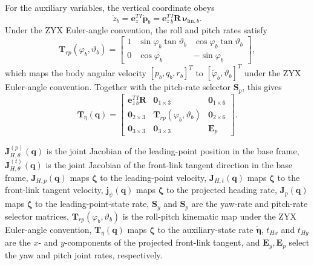 \documentclass[12pt,a4paper]{report}
\newcommand{\newsymbols}[1]{\par\noindent{}#1\par\vspace{0.35em}}
\begin{document}
For the auxiliary variables, the vertical coordinate obeys
\begin{equation}
\dot{z}_b = \mathbf{e}_z^T {}^{I}\dot{\mathbf{p}}_b = \mathbf{e}_z^T {}_{b}^{I}\mathbf{R}\,\boldsymbol{\nu}_{\mathrm{lin},b}.
\end{equation}
Under the ZYX Euler-angle convention, the roll and pitch rates satisfy
\begin{equation}
\mathbf{T}_{rp}(\varphi_b,\vartheta_b) =
\begin{bmatrix}
1 & \sin \varphi_b \tan \vartheta_b & \cos \varphi_b \tan \vartheta_b \\
0 & \cos \varphi_b & -\sin \varphi_b
\end{bmatrix},
\end{equation}
which maps the body angular velocity $[p_b,q_b,r_b]^T$ to $[\dot{\varphi}_b,\dot{\vartheta}_b]^T$ under the ZYX Euler-angle convention. Together with the pitch-rate selector $\mathbf{S}_p$, this gives
\begin{equation}
\mathbf{T}_{\eta}(\mathbf{q}) =
\begin{bmatrix}
\mathbf{e}_z^T {}_{b}^{I}\mathbf{R} & \mathbf{0}_{1\times3} & \mathbf{0}_{1\times6} \\
\mathbf{0}_{2\times3} & \mathbf{T}_{rp}(\varphi_b,\vartheta_b) & \mathbf{0}_{2\times6} \\
\mathbf{0}_{3\times3} & \mathbf{0}_{3\times3} & \mathbf{E}_p
\end{bmatrix}.
\end{equation}
\newsymbols{$\mathbf{J}_{H,\theta}^{(p)}(\mathbf{q})$ is the joint Jacobian of the leading-point position in the base frame, $\mathbf{J}_{H,\theta}^{(t)}(\mathbf{q})$ is the joint Jacobian of the front-link tangent direction in the base frame, $\mathbf{J}_{H,p}(\mathbf{q})$ maps $\boldsymbol{\zeta}$ to the leading-point velocity, $\mathbf{J}_{H,t}(\mathbf{q})$ maps $\boldsymbol{\zeta}$ to the front-link tangent velocity, $\mathbf{j}_{\psi}(\mathbf{q})$ maps $\boldsymbol{\zeta}$ to the projected heading rate, $\mathbf{J}_p(\mathbf{q})$ maps $\boldsymbol{\zeta}$ to the leading-point-state rate, $\mathbf{S}_y$ and $\mathbf{S}_p$ are the yaw-rate and pitch-rate selector matrices, $\mathbf{T}_{rp}(\varphi_b,\vartheta_b)$ is the roll-pitch kinematic map under the ZYX Euler-angle convention, $\mathbf{T}_{\eta}(\mathbf{q})$ maps $\boldsymbol{\zeta}$ to the auxiliary-state rate $\dot{\boldsymbol{\eta}}$, $t_{Hx}$ and $t_{Hy}$ are the $x$- and $y$-components of the projected front-link tangent, and $\mathbf{E}_y,\mathbf{E}_p$ select the yaw and pitch joint rates, respectively.}
\end{document}
